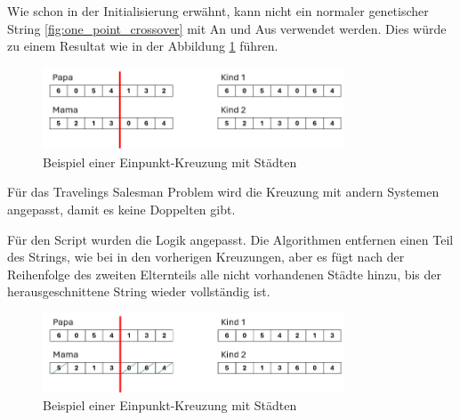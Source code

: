 Wie schon in der Initialisierung erwähnt, kann nicht ein normaler 
genetischer String \ref{fig:one_point_crossover} mit An und 
Aus verwendet werden. Dies würde zu einem Resultat wie in der Abbildung 
\ref{fig:one_point_crossover_cities} führen.

\begin{figure}
	\centering
	\includegraphics[width=0.8\textwidth]{
		papers/varalg/images/teil3/07GeneticStringCitiesCrossoverStandard.png
	}
	\caption{Beispiel einer Einpunkt-Kreuzung mit Städten}
	\label{fig:one_point_crossover_cities}
\end{figure}

Für das Travelings Salesman Problem wird die Kreuzung mit andern Systemen 
angepasst, damit es keine Doppelten gibt.

Für den Script wurden die Logik angepasst. Die Algorithmen entfernen einen 
Teil des Strings, wie bei in den vorherigen Kreuzungen, aber es fügt nach 
der Reihenfolge des zweiten Elternteils alle nicht vorhandenen 
Städte hinzu, bis der herausgeschnittene String wieder vollständig ist.

\begin{figure}
	\centering
	\includegraphics[width=0.8\textwidth]{
		papers/varalg/images/teil3/08GeneticStringCitiesCrossoverSimple.png
	}
	\caption{Beispiel einer Einpunkt-Kreuzung mit Städten}
	\label{fig:crossover_order_cities}
\end{figure}

